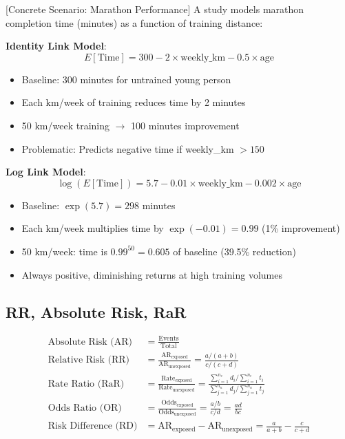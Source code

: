 \documentclass{article}
\begin{document}
[Concrete Scenario: Marathon Performance]
A study models marathon completion time (minutes) as a function of training distance:

\textbf{Identity Link Model}:
\begin{equation}
E[\text{Time}] = 300 - 2 \times \text{weekly\_km} - 0.5 \times \text{age}
\end{equation}
\begin{itemize}
    \item Baseline: 300 minutes for untrained young person
    \item Each km/week of training reduces time by 2 minutes
    \item 50 km/week training $\rightarrow$ 100 minutes improvement
    \item Problematic: Predicts negative time if weekly\_km $> 150$
\end{itemize}

\textbf{Log Link Model}:
\begin{equation}
\log(E[\text{Time}]) = 5.7 - 0.01 \times \text{weekly\_km} - 0.002 \times \text{age}
\end{equation}
\begin{itemize}
    \item Baseline: $\exp(5.7) = 298$ minutes
    \item Each km/week multiplies time by $\exp(-0.01) = 0.99$ (1\% improvement)
    \item 50 km/week: time is $0.99^{50} = 0.605$ of baseline (39.5\% reduction)
    \item Always positive, diminishing returns at high training volumes
\end{itemize}



\subsection{RR, Absolute Risk, RaR}

\begin{align}
\text{Absolute Risk (AR)} &= \frac{\text{Events}}{\text{Total}} \\[0.5em]
\text{Relative Risk (RR)} &= \frac{\text{AR}_{\text{exposed}}}{\text{AR}_{\text{unexposed}}} = \frac{a/(a+b)}{c/(c+d)} \\[0.5em]
\text{Rate Ratio (RaR)} &= \frac{\text{Rate}_{\text{exposed}}}{\text{Rate}_{\text{unexposed}}} = \frac{\sum_{i=1}^{n_e} d_i / \sum_{i=1}^{n_e} t_i}{\sum_{j=1}^{n_u} d_j / \sum_{j=1}^{n_u} t_j} \\[0.5em]
\text{Odds Ratio (OR)} &= \frac{\text{Odds}_{\text{exposed}}}{\text{Odds}_{\text{unexposed}}} = \frac{a/b}{c/d} = \frac{ad}{bc} \\[0.5em]
\text{Risk Difference (RD)} &= \text{AR}_{\text{exposed}} - \text{AR}_{\text{unexposed}} = \frac{a}{a+b} - \frac{c}{c+d}
\end{align}
\end{document}
